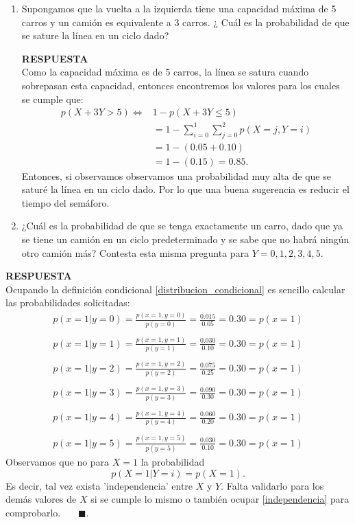 \documentclass[11pt,letterpaper]{article}
\newcommand{\res}{\textbf{RESPUESTA}\\}
\newcommand{\fin}{$\blacksquare.$}
\begin{document}
\begin{enumerate}
\res Utilizando la probabilidad conjunta sería:
\begin{align*}
p(X=1,Y=1)=0.030.
\end{align*}
Observemos que para este caso en especifico se cumple que 
\begin{align*}
p(X=1,Y=1)=0.030=(0.10)\cdot (0.30)=p(X=1)p(Y=1).
\end{align*}

\item Supongamos que la vuelta a la izquierda tiene una capacidad máxima de 5 carros y un camión es equivalente a 3 carros. ¿ Cuál es la probabilidad de que se sature la línea en un ciclo dado?

\res Como la capacidad máxima es de 5 carros, la línea se satura cuando sobrepasan esta capacidad, entonces encontremos los valores para los cuales se cumple que:
\begin{align*}
p(X+3Y>5) \Leftrightarrow& 1-p(X+3Y\leq 5)\\
&=1-\sum_{i=0}^1\sum_{j=0}^2p(X=j,Y=i)\\
&=1-(0.05+0.10)\\
&=1-(0.15)=0.85.
\end{align*}
Entonces, si observamos observamos una probabilidad muy alta de que se saturé la línea en un ciclo dado. Por lo que una buena  sugerencia es reducir el tiempo del semáforo.

\item  ¿Cuál es la probabilidad de que se tenga exactamente un carro, dado que ya se tiene un camión en un ciclo predeterminado y se sabe que no habrá ningún otro camión más? Contesta esta misma pregunta para $Y = 0, 1, 2, 3, 4, 5$.
\end{enumerate}

\res Ocupando la definición condicional \ref{distribucion_condicional} es sencillo calcular las probabilidades solicitadas:
\begin{align*}
p(x=1|y=0) = \frac{p(x=1,y=0)}{p(y=0)}=\frac{0.015}{0.05}=0.30 =p(x=1)\\ \\
p(x=1|y=1) = \frac{p(x=1,y=1)}{p(y=1)}=\frac{0.030}{0.10}=0.30=p(x=1)\\ \\
p(x=1|y=2) = \frac{p(x=1,y=2)}{p(y=2)}=\frac{0.075}{0.25}=0.30=p(x=1)\\ \\
p(x=1|y=3) = \frac{p(x=1,y=3)}{p(y=3)}=\frac{0.090}{0.30}=0.30=p(x=1)\\ \\
p(x=1|y=4) = \frac{p(x=1,y=4)}{p(y=4)}=\frac{0.060}{0.20}=0.30=p(x=1)\\ \\
p(x=1|y=5) = \frac{p(x=1,y=5)}{p(y=5)}=\frac{0.030}{0.10}=0.30=p(x=1)
\end{align*}
Observamos que no para $X=1$ la probabilidad 
$$p(X=1|Y=i)=p(X=1).$$
Es decir, tal vez exista 'independencia' entre $X$ y $Y$. Falta validarlo para los demás valores de $X$ si se cumple lo mismo o también ocupar \ref{independencia} para comprobarlo. \ \ \ \fin 
\end{document}
